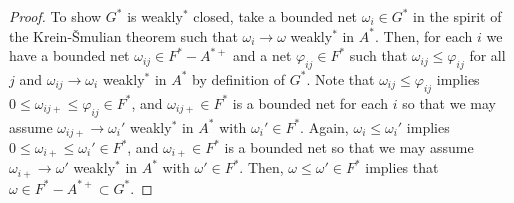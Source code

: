 \documentclass[noamsfonts,a4paper,10pt]{amsart}
\theoremstyle{plain}
\theoremstyle{definition}
\theoremstyle{remark}
\begin{document}
\begin{proof}
To show $G^*$ is weakly$^*$ closed, take a bounded net $\omega_i\in G^*$ in the spirit of the Krein-\v Smulian theorem such that $\omega_i\to\omega$ weakly$^*$ in $A^*$.
Then, for each $i$ we have a bounded net $\omega_{ij}\in F^*-A^{*+}$ and a net $\varphi_{ij}\in F^*$ such that $\omega_{ij}\le\varphi_{ij}$ for all $j$ and $\omega_{ij}\to\omega_i$ weakly$^*$ in $A^*$ by definition of $G^*$.
Note that $\omega_{ij}\le\varphi_{ij}$ implies $0\le\omega_{ij+}\le\varphi_{ij}\in F^*$, and $\omega_{ij+}\in F^*$ is a bounded net for each $i$ so that we may assume $\omega_{ij+}\to\omega_i'$ weakly$^*$ in $A^*$ with $\omega_i'\in F^*$.
Again, $\omega_i\le\omega_i'$ implies $0\le\omega_{i+}\le\omega_i'\in F^*$, and $\omega_{i+}\in F^*$ is a bounded net so that we may assume $\omega_{i+}\to\omega'$ weakly$^*$ in $A^*$ with $\omega'\in F^*$.
Then, $\omega\le\omega'\in F^*$ implies that $\omega\in F^*-A^{*+}\subset G^*$.
\end{proof}



\end{document}
